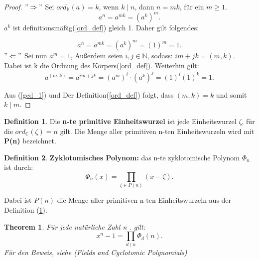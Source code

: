 \documentclass[12pt,oneside]{article}
\newtheorem{theorem}{Theorem}[section]
\theoremstyle{remark}
\theoremstyle{definition}
\newtheorem{definition}{Definition}[section]
\begin{document}
\smallskip

\begin{proof}
$"\Rightarrow"$\newline
Sei $ord_{\mathbb{K}}(a) = k $, wenn $k \mid n$, dann $n = mk$, für ein $ m \geq 1$.
\begin{equation}
    a^n = a^{mk} = (a^k)^m. 
\end{equation}
$a^k$ ist definitionsmäßig(\ref{ord_def}) gleich 1. Daher gilt folgendes:

\begin{equation}
    a^n = a^{mk} = (a^k)^m = (1)^m = 1.
\end{equation}
$"\Leftarrow"$\newline
Sei nun $a^m = 1$, Außerdem seien $i,j \in \mathbb{N}$, sodass:\newline
$im + jk = (m,k)$. Dabei ist k die Ordnung des Körpers(\ref{ord_def}).\newline\newline
Weiterhin gilt: 
\begin{equation}\label{gcd_1}
   a^{(m,k)} = a^{im + jk} = (a^m)^i \cdot (a^k)^j = (1)^i (1)^k = 1.
\end{equation}

Aus (\ref{gcd_1}) und Der Definition(\ref{ord_def}) folgt, dass $(m,k) = k$ und somit $k \mid m$.
\end{proof}

\smallskip

\begin{definition}\label{prim_ein}
Die \textbf{n-te primitive Einheitswurzel} ist jede Einheitswurzel $\zeta$, für die $ord_{\mathbb{C}}(\zeta) = n $ gilt. Die Menge aller primitiven n-ten Einheitswurzeln wird mit \textbf{P(n)} bezeichnet. 
\end{definition}

\smallskip

\begin{definition}
\textbf{Zyklotomisches Polynom:} das n-te zyklotomische Polynom $\Phi_{n}$ ist durch:\newline
\begin{equation}
    \Phi_{n}(x) = \prod_{\zeta \in P(n)} (x -\zeta).
\end{equation}

Dabei ist $P(n)$ die Menge aller primitiven n-ten Einheitswurzeln aus der Definition (\ref{prim_ein}). 
\end{definition}

\smallskip

\begin{theorem}
Für jede natürliche Zahl n . gilt:\newline
\begin{equation}
    x^n - 1 = \prod_{d \mid n} \Phi_{d}(n).
\end{equation}
Für den Beweis, siehe (Fields and Cyclotomic Polynomials) 
\end{theorem}
\end{document}
